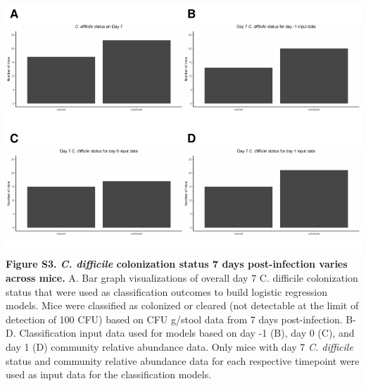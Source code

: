 \documentclass[11pt,]{article}
\begin{document}
\includegraphics{figure_S3.pdf} \textbf{Figure S3. \emph{C. difficile}
colonization status 7 days post-infection varies across mice.} A. Bar
graph visualizations of overall day 7 C. difficile colonization status
that were used as classification outcomes to build logistic regression
models. Mice were classified as colonized or cleared (not detectable at
the limit of detection of 100 CFU) based on CFU g/stool data from 7 days
post-infection. B-D. Classification input data used for models based on
day -1 (B), day 0 (C), and day 1 (D) community relative abundance data.
Only mice with day 7 \emph{C. difficile} status and community relative
abundance data for each respective timepoint were used as input data for
the classification models.

\newpage
\end{document}
